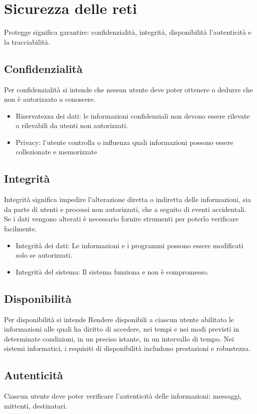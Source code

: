\documentclass[oneside,a4paper,11pt]{book}
\theoremstyle{italicstyle}
\theoremstyle{normStyle}
\begin{document}
\chapter{Sicurezza delle reti}
Protegge significa garantire: confidenzialità, integrità, disponibilità
l'autenticità e la tracciabilità.
\section{Confidenzialità}
Per confidenzialità si intende che nessun utente deve poter ottenere o 
dedurre che non è autorizzato a conoscere.
\begin{itemize}
  \item Riservatezza dei dati: le informazioni confidenziali non devono
  essere rilevate o rilevabili da utenti non autorizzati.
  \item Privacy: l'utente controlla  o influenza quali informazioni possono 
  essere collezionate e memorizzate 
\end{itemize}
\section{Integrità}
Integrità significa impedire l’alterazione diretta o indiretta delle informazioni, 
sia da parte di utenti e processi non autorizzati, che a seguito di eventi accidentali.
Se i dati vengono alterati è necessario fornire strumenti per poterlo verificare facilmente.
\begin{itemize}
  \item Integrità dei dati: Le informazioni e i programmi possono essere modificati solo se autorizzati.
  \item Integrità del sistema: Il sistema funziona e non è compromesso.
\end{itemize}
\section{Disponibilità}
Per disponibilità si intende Rendere disponibili a ciascun utente abilitato 
le informazioni alle quali ha diritto di accedere, nei tempi e nei modi previsti
in determinate condizioni, in un preciso istante, in un intervallo di tempo.
Nei sistemi informatici, i requisiti di disponibilità includono prestazioni e robustezza.
\section{Autenticità}
Ciascun utente deve poter verificare l'autenticità delle informazioni: messaggi, 
mittenti, destinatari.
\end{document}
